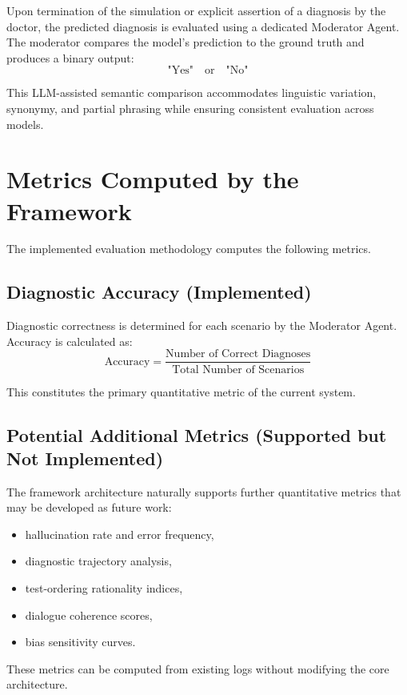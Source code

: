 Upon termination of the simulation or explicit assertion of a diagnosis by the doctor, the predicted diagnosis is evaluated using a dedicated Moderator Agent. The moderator compares the model’s prediction to the ground truth and produces a binary output:
\[
\text{"Yes"} \quad \text{or} \quad \text{"No"}
\]

This LLM-assisted semantic comparison accommodates linguistic variation, synonymy, and partial phrasing while ensuring consistent evaluation across models.

\section{Metrics Computed by the Framework}

The implemented evaluation methodology computes the following metrics.

\subsection{Diagnostic Accuracy (Implemented)}

Diagnostic correctness is determined for each scenario by the Moderator Agent. Accuracy is calculated as:
\[
\text{Accuracy} = \frac{\text{Number of Correct Diagnoses}}{\text{Total Number of Scenarios}}
\]

This constitutes the primary quantitative metric of the current system.



\subsection{Potential Additional Metrics (Supported but Not Implemented)}

The framework architecture naturally supports further quantitative metrics that may be developed as future work:
\begin{itemize}
    \item hallucination rate and error frequency,
    \item diagnostic trajectory analysis,
    \item test-ordering rationality indices,
    \item dialogue coherence scores,
    \item bias sensitivity curves.
\end{itemize}

These metrics can be computed from existing logs without modifying the core architecture.

